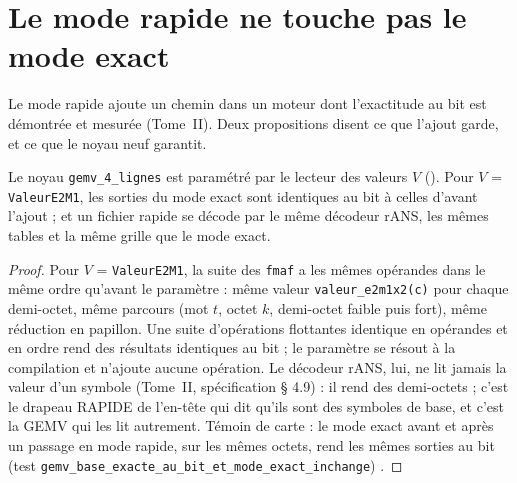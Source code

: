 \begin{figure}[tbp]
\centering
\GrapheLatentsNuage
{}
\label{fig:t3-lat-nuage}
\end{figure}

\section{Le mode rapide ne touche pas le mode exact}\label{t3sno:sec:propositions}

Le mode rapide ajoute un chemin dans un moteur dont l'exactitude au bit est démontrée et mesurée (Tome~II). Deux propositions disent ce que l'ajout garde, et ce que le noyau neuf garantit.

\begin{proposition}\label{t3sno:prop:b1}
Le noyau \texttt{gemv\_4\_lignes} est paramétré par le lecteur des valeurs $V$ (). Pour $V$ = \texttt{ValeurE2M1}, les sorties du mode exact sont identiques au bit à celles d'avant l'ajout ; et un fichier rapide se décode par le même décodeur rANS, les mêmes tables et la même grille que le mode exact.
\end{proposition}
\begin{proof}
Pour $V$ = \texttt{ValeurE2M1}, la suite des \texttt{fmaf} a les mêmes opérandes dans le même ordre qu'avant le paramètre : même valeur \texttt{valeur\_e2m1x2(c)} pour chaque demi-octet, même parcours (mot $t$, octet $k$, demi-octet faible puis fort), même réduction en papillon. Une suite d'opérations flottantes identique en opérandes et en ordre rend des résultats identiques au bit ; le paramètre se résout à la compilation et n'ajoute aucune opération. Le décodeur rANS, lui, ne lit jamais la valeur d'un symbole (Tome~II, spécification § 4.9) : il rend des demi-octets ; c'est le drapeau RAPIDE de l'en-tête qui dit qu'ils sont des symboles de base, et c'est la GEMV qui les lit autrement. Témoin de carte : le mode exact avant et après un passage en mode rapide, sur les mêmes octets, rend les mêmes sorties au bit (test \texttt{gemv\_base\_exacte\_au\_bit\_et\_mode\_exact\_inchange}) \mes.
\end{proof}

